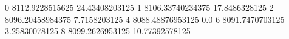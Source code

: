 0 8112.9228515625 24.43408203125
1 8106.33740234375 17.8486328125
2 8096.20458984375 7.7158203125
4 8088.48876953125 0.0
6 8091.7470703125 3.25830078125
8 8099.2626953125 10.77392578125
